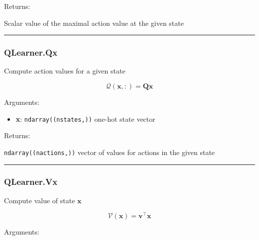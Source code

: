 Returns:

Scalar value of the maximal action value at the given state

\begin{center}\rule{0.5\linewidth}{\linethickness}\end{center}

\subsubsection{QLearner.Qx}\label{qlearner.qx}

\begin{Shaded}
\begin{Highlighting}[]
\end{Highlighting}
\end{Shaded}

Compute action values for a given state

\[
\mathcal Q(\mathbf x, :) = \mathbf Q \mathbf x
\]

Arguments:

\begin{itemize}
\tightlist
\item
  \textbf{x}: \texttt{ndarray((nstates,))} one-hot state vector
\end{itemize}

Returns:

\texttt{ndarray((nactions,))} vector of values for actions in the given
state

\begin{center}\rule{0.5\linewidth}{\linethickness}\end{center}

\subsubsection{QLearner.Vx}\label{qlearner.vx}

\begin{Shaded}
\begin{Highlighting}[]
\end{Highlighting}
\end{Shaded}

Compute value of state \(\mathbf x\)

\[
\mathcal V(\mathbf x) = \mathbf v^\top \mathbf x
\]

Arguments:

